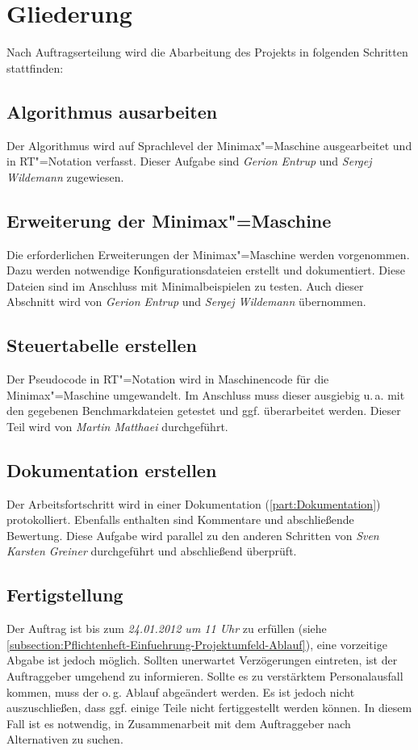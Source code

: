 \section{Gliederung}
\label{section:Pflichtenheft-SystemtechnischeLoesung-Gliederung}

Nach Auftragserteilung wird die Abarbeitung des Projekts in folgenden Schritten stattfinden:

\subsection{Algorithmus ausarbeiten}
Der Algorithmus wird auf Sprachlevel der Minimax"=Maschine ausgearbeitet und in RT"=Notation verfasst. Dieser Aufgabe sind \emph{Gerion Entrup} und \emph{Sergej Wildemann} zugewiesen.

\subsection{Erweiterung der Minimax"=Maschine}
Die erforderlichen Erweiterungen der Minimax"=Maschine werden vorgenommen. Dazu werden notwendige Konfigurationsdateien erstellt und dokumentiert. Diese Dateien sind im Anschluss mit Minimalbeispielen zu testen. Auch dieser Abschnitt wird von \emph{Gerion Entrup} und \emph{Sergej Wildemann} übernommen.

\subsection{Steuertabelle erstellen}
Der Pseudocode in RT"=Notation wird in Maschinencode für die Minimax"=Maschine umgewandelt. Im Anschluss muss dieser ausgiebig u.\,a. mit den gegebenen Benchmarkdateien getestet und ggf. überarbeitet werden. Dieser Teil wird von \emph{Martin Matthaei} durchgeführt.

\subsection{Dokumentation erstellen}
Der Arbeitsfortschritt wird in einer Dokumentation (\autoref{part:Dokumentation}) protokolliert. Ebenfalls enthalten sind Kommentare und abschließende Bewertung. Diese Aufgabe wird parallel zu den anderen Schritten von \emph{Sven Karsten Greiner} durchgeführt und abschließend überprüft.

\subsection{Fertigstellung}
Der Auftrag ist bis zum \emph{24.01.2012 um 11 Uhr} zu erfüllen (siehe \autoref{subsection:Pflichtenheft-Einfuehrung-Projektumfeld-Ablauf}), eine vorzeitige Abgabe ist jedoch möglich. Sollten unerwartet Verzögerungen eintreten, ist der Auftraggeber umgehend zu informieren. Sollte es zu verstärktem Personalausfall kommen, muss der o.\,g. Ablauf abgeändert werden. Es ist jedoch nicht auszuschließen, dass ggf. einige Teile nicht fertiggestellt werden können. In diesem Fall ist es notwendig, in Zusammenarbeit mit dem Auftraggeber nach Alternativen zu suchen.

